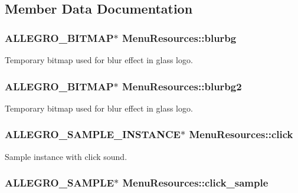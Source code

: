 \subsection{Member Data Documentation}
\hypertarget{structMenuResources_a8e652f336e85c83f1ddfeb7cf093fcfe}{
\subsubsection[{blurbg}]{\setlength{\rightskip}{0pt plus 5cm}A\+L\+L\+E\+G\+R\+O\+\_\+\+B\+I\+T\+M\+A\+P$\ast$ Menu\+Resources\+::blurbg}}\label{structMenuResources_a8e652f336e85c83f1ddfeb7cf093fcfe}
Temporary bitmap used for blur effect in glass logo. \hypertarget{structMenuResources_a531163276d29cb01f2f7101ce460bc07}{
\subsubsection[{blurbg2}]{\setlength{\rightskip}{0pt plus 5cm}A\+L\+L\+E\+G\+R\+O\+\_\+\+B\+I\+T\+M\+A\+P$\ast$ Menu\+Resources\+::blurbg2}}\label{structMenuResources_a531163276d29cb01f2f7101ce460bc07}
Temporary bitmap used for blur effect in glass logo. \hypertarget{structMenuResources_ad22d0877f4bfee98acd1043b32b9d36a}{
\subsubsection[{click}]{\setlength{\rightskip}{0pt plus 5cm}A\+L\+L\+E\+G\+R\+O\+\_\+\+S\+A\+M\+P\+L\+E\+\_\+\+I\+N\+S\+T\+A\+N\+C\+E$\ast$ Menu\+Resources\+::click}}\label{structMenuResources_ad22d0877f4bfee98acd1043b32b9d36a}
Sample instance with click sound. \hypertarget{structMenuResources_af61b149138ed96a053d19dc4a26edda1}{
\subsubsection[{click\+\_\+sample}]{\setlength{\rightskip}{0pt plus 5cm}A\+L\+L\+E\+G\+R\+O\+\_\+\+S\+A\+M\+P\+L\+E$\ast$ Menu\+Resources\+::click\+\_\+sample}}\label{structMenuResources_af61b149138ed96a053d19dc4a26edda1}
